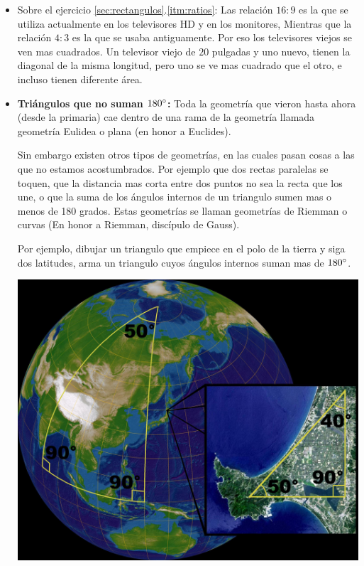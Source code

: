 \documentclass[a4paper,11pt,spanish,sans]{exam}
\begin{document}
\begin{itemize}

	\item Sobre el ejercicio \ref{sec:rectangulos}.\ref{itm:ratios}: Las relación $16:9$ es la que se utiliza actualmente en los televisores HD y en los monitores, Mientras que la relación $4:3$ es la que se usaba antiguamente. Por eso los televisores viejos se ven mas cuadrados. 
	Un televisor viejo de $20$ pulgadas y uno nuevo, tienen la diagonal de la misma longitud, pero uno se ve mas cuadrado que el otro, e incluso tienen diferente área. 
	
	
	\item \textbf{Triángulos que no suman $180\degree$:} Toda la geometría que vieron hasta ahora (desde la primaria) cae dentro de una rama de la geometría llamada geometría Eulidea o plana (en honor a Euclides).	
		\begin{minipage}{0.6\textwidth}
		Sin embargo existen otros tipos de geometrías, en las cuales pasan cosas a las que no estamos acostumbrados.
		Por ejemplo que dos rectas paralelas se toquen, que la distancia mas corta entre dos puntos no sea la recta que los une, o que la suma  de los ángulos internos de un triangulo sumen mas o menos de 180 grados.
		Estas geometrías se llaman geometrías de Riemman o curvas (En honor a Riemman, discípulo de Gauss).
		
		Por ejemplo, dibujar un triangulo que empiece en el polo de la tierra y siga dos latitudes, arma un triangulo cuyos ángulos internos suman mas de $180\degree$.
		\end{minipage}
		\begin{minipage}{0.4\textwidth}
			\begin{center}
				\includegraphics[width=0.95\linewidth]{esphtri.jpg}
			\end{center}
		\end{minipage}
		

\end{itemize}
\end{document}

